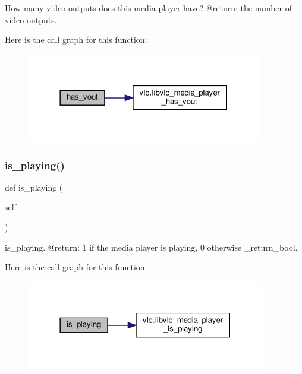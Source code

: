 \begin{DoxyVerb}How many video outputs does this media player have?
@return: the number of video outputs.
\end{DoxyVerb}
 Here is the call graph for this function\+:
\nopagebreak
\begin{figure}[H]
\begin{center}
\leavevmode
\includegraphics[width=290pt]{classvlc_1_1_media_player_a7a943244b82efa08b86d89339de2319c_cgraph}
\end{center}
\end{figure}
\mbox{\label{classvlc_1_1_media_player_a48c6394263dfdf45970dbd872d52c8d8}} 
\subsubsection{\texorpdfstring{is\+\_\+playing()}{is\_playing()}}
{\footnotesize\ttfamily def is\+\_\+playing (\begin{DoxyParamCaption}\item[{}]{self }\end{DoxyParamCaption})}

\begin{DoxyVerb}is_playing.
@return: 1 if the media player is playing, 0 otherwise \libvlc_return_bool.
\end{DoxyVerb}
 Here is the call graph for this function\+:
\nopagebreak
\begin{figure}[H]
\begin{center}
\leavevmode
\includegraphics[width=294pt]{classvlc_1_1_media_player_a48c6394263dfdf45970dbd872d52c8d8_cgraph}
\end{center}
\end{figure}
\mbox{\label{classvlc_1_1_media_player_aae750b3662aafae640c06bffd15b4c7c}} 
